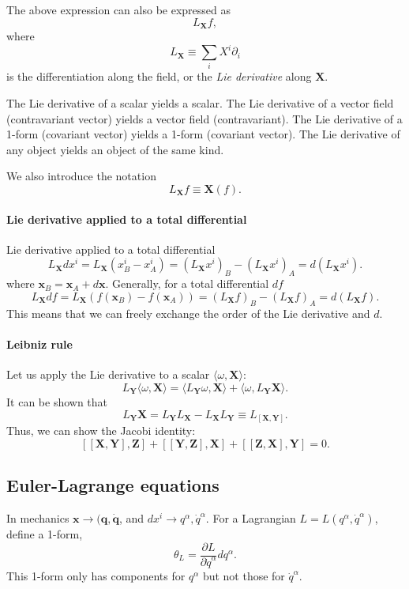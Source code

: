 \documentclass{article}
\begin{document}
The above expression can also be expressed as
$$
L_{\mathbf X} f,
$$
where
$$
L_{\mathbf X} \equiv \sum_i X^i \partial_i
$$
is the differentiation along the field,
or the \emph{Lie derivative} along $\mathbf X$.

The Lie derivative of a scalar yields a scalar.
The Lie derivative of a vector field (contravariant vector) yields a vector field (contravariant).
The Lie derivative of a 1-form (covariant vector) yields a 1-form (covariant vector).
%
The Lie derivative of any object yields an object of the same kind.


We also introduce the notation
$$
L_{\mathbf X} f \equiv \mathbf X(f).
$$

\paragraph{Lie derivative applied to a total differential}

Lie derivative applied to a total differential
$$
L_{\mathbf X} dx^i
= L_{\mathbf X} (x^i_B - x^i_A)
= (L_{\mathbf X} x^i)_B
- (L_{\mathbf X} x^i)_A
= d (L_{\mathbf X} x^i).
$$
where $\mathbf x_B = \mathbf x_A + d\mathbf x$.
%
Generally, for a total differential $df$
$$
L_{\mathbf X} df
= L_{\mathbf X} (f(\mathbf x_B) - f(\mathbf x_A))
= (L_{\mathbf X} f)_B
- (L_{\mathbf X} f)_A
= d (L_{\mathbf X} f).
$$
This means that we can freely exchange the order of
the Lie derivative and $d$.

\paragraph{Leibniz rule}

Let us apply the Lie derivative to a scalar $\langle \omega, \mathbf X\rangle$:
$$
L_{\mathbf Y} \langle\omega, \mathbf X\rangle
=
\langle L_{\mathbf Y}\omega, \mathbf X\rangle
+
\langle \omega, L_{\mathbf Y} \mathbf X \rangle.
$$
It can be shown that
$$
L_{\mathbf Y} \mathbf X
= L_{\mathbf Y} L_{\mathbf X} - L_{\mathbf X} L_{\mathbf Y}
\equiv L_{[\mathbf X, \mathbf Y]}.
$$
Thus, we can show the Jacobi identity:
$$
[[\mathbf X, \mathbf Y], \mathbf Z]
+[[\mathbf Y, \mathbf Z], \mathbf X]
+[[\mathbf Z, \mathbf X], \mathbf Y] = 0.
$$


\subsection{Euler-Lagrange equations}


In mechanics $\mathbf x \rightarrow (\mathbf q, \dot{\mathbf q}$,
and $dx^i \rightarrow q^\alpha, \dot q^\alpha$.
%
For a Lagrangian $L=L(q^\alpha, \dot q^\alpha)$,
define a 1-form,
$$
\theta_L = \frac{ \partial L } { \partial \dot q^\alpha } d q^\alpha.
$$
This 1-form only has components for $q^\alpha$ but not those for $\dot q^\alpha$.
\end{document}
